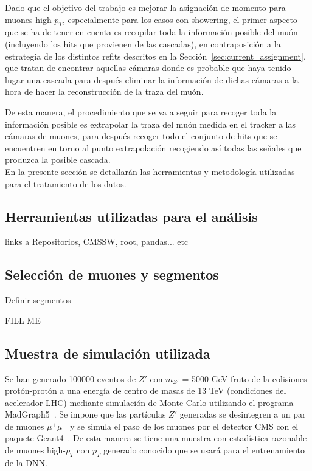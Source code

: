 
Dado que el objetivo del trabajo es mejorar la asignaci\'on de momento para muones high-$p_{T}$, especialmente para los casos con showering, el primer aspecto que se ha de tener en cuenta es recopilar toda la informaci\'on posible del mu\'on (incluyendo los hits que provienen de las cascadas), en contraposici\'on a la estrategia de los distintos refits descritos en la Secci\'on~\ref{sec:current_assignment}, que tratan de encontrar aquellas c\'amaras donde es probable que haya tenido lugar una cascada para despu\'es eliminar la informaci\'on de dichas c\'amaras a la hora de hacer la reconstrucci\'on de la traza del mu\'on.

De esta manera, el procedimiento que se va a seguir para recoger toda la informaci\'on posible es extrapolar la traza del mu\'on medida en el tracker a las c\'amaras de muones, para despu\'es recoger todo el conjunto de hits que se encuentren en torno al punto extrapolaci\'on recogiendo as\'i todas las señales que produzca la posible cascada. \\

En la presente secci\'on se detallar\'an las herramientas y metodolog\'ia utilizadas para el tratamiento de los datos.


\subsection{Herramientas utilizadas para el an\'alisis}\label{sec:tools}

links a Repositorios, CMSSW, root, pandas... etc


\subsection{Selecci\'on de muones y segmentos}\label{sec:selection}


Definir segmentos

FILL ME


\subsection{Muestra de simulaci\'on utilizada}\label{sec:sample}

Se han generado 100000 eventos de $Z'$ con $m_{Z'}$ = 5000 GeV fruto de la colisiones prot\'on-prot\'on a una energ\'ia de centro de masas de 13 TeV (condiciones del acelerador LHC) mediante simulaci\'on de Monte-Carlo utilizando el programa MadGraph5~\cite{Alwall:2014hca}. Se impone que las part\'iculas $Z'$ generadas se desintegren a un par de muones $\mu^{+}\mu^{-}$ y se simula el paso de los muones por el detector CMS con el paquete Geant4~\cite{Agostinelli:2002hh}. De esta manera se tiene una muestra con estad\'istica razonable de muones high-$p_{T}$ con $p_{T}$ generado conocido que se usar\'a para el entrenamiento de la DNN. \\

